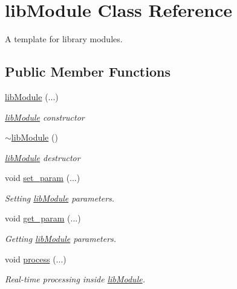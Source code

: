 \hypertarget{classlibModule}{}\section{lib\+Module Class Reference}
\label{classlibModule}


A template for library modules.  


\subsection*{Public Member Functions}
\begin{DoxyCompactItemize}
\item 
\mbox{\label{classlibModule_aea7a75e970a43e44eaa400427cd8ff12}} 
\hyperlink{classlibModule_aea7a75e970a43e44eaa400427cd8ff12}{lib\+Module} (...)
\begin{DoxyCompactList}\small\item\em \hyperlink{classlibModule}{lib\+Module} constructor \end{DoxyCompactList}\item 
\mbox{\label{classlibModule_a80881d812a85c51472d78f79209439d0}} 
\hyperlink{classlibModule_a80881d812a85c51472d78f79209439d0}{$\sim$lib\+Module} ()
\begin{DoxyCompactList}\small\item\em \hyperlink{classlibModule}{lib\+Module} destructor \end{DoxyCompactList}\item 
\mbox{\label{classlibModule_ad9facd367f2700af9064c3100e635379}} 
void \hyperlink{classlibModule_ad9facd367f2700af9064c3100e635379}{set\+\_\+param} (...)
\begin{DoxyCompactList}\small\item\em Setting \hyperlink{classlibModule}{lib\+Module} parameters. \end{DoxyCompactList}\item 
\mbox{\label{classlibModule_a29e54e26959d3fb1339b0442afdf6d7e}} 
void \hyperlink{classlibModule_a29e54e26959d3fb1339b0442afdf6d7e}{get\+\_\+param} (...)
\begin{DoxyCompactList}\small\item\em Getting \hyperlink{classlibModule}{lib\+Module} parameters. \end{DoxyCompactList}\item 
\mbox{\label{classlibModule_af3049f489a9efea1f630418f11efa8d6}} 
void \hyperlink{classlibModule_af3049f489a9efea1f630418f11efa8d6}{process} (...)
\begin{DoxyCompactList}\small\item\em Real-\/time processing inside \hyperlink{classlibModule}{lib\+Module}. \end{DoxyCompactList}\end{DoxyCompactItemize}


